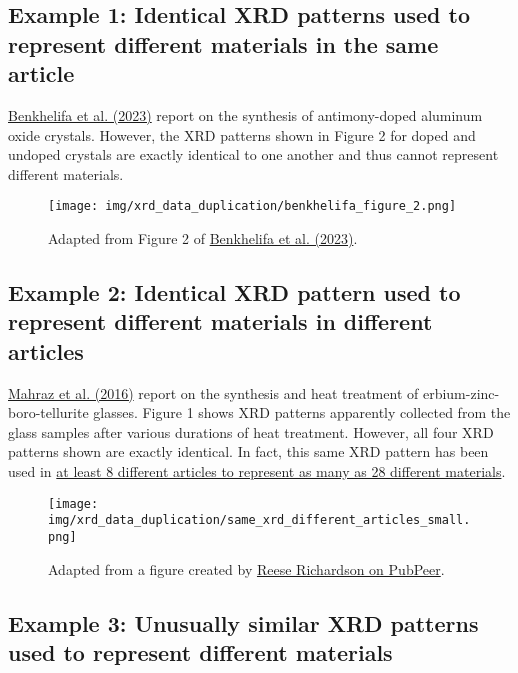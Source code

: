 \documentclass[letterpaper, 12pt]{article}
\begin{document}
\subsection*{Example 1: Identical XRD patterns used to represent different materials in the same article}

\href{https://doi.org/10.1007/s10971-023-06078-x}{Benkhelifa et al. (2023)} report on the synthesis of antimony-doped aluminum oxide crystals. However, the XRD patterns shown in Figure 2 for doped and undoped crystals are exactly identical to one another and thus cannot represent different materials.

\begin{figure}[h!tbp]
    \centering
    \texttt{[image: img/xrd\_data\_duplication/benkhelifa\_figure\_2.png]}
    \caption*{Adapted from Figure 2 of \href{https://doi.org/10.1007/s10971-023-06078-x}{Benkhelifa et al. (2023)}.}
\end{figure}

\pagebreak

\subsection*{Example 2: Identical XRD pattern used to represent different materials in different articles}

\href{https://doi.org/10.1016/j.jlumin.2016.07.051}{Mahraz et al. (2016)} report on the synthesis and heat treatment of erbium-zinc-boro-tellurite glasses. Figure 1 shows XRD patterns apparently collected from the glass samples after various durations of heat treatment. However, all four XRD patterns shown are exactly identical. In fact, this same XRD pattern has been used in \href{https://pubpeer.com/publications/27A40862805C08DD269520435EAC67\#1}{at least 8 different articles to represent as many as 28 different materials}.

\begin{figure}[h!tbp]
    \centering
    \texttt{[image: img/xrd\_data\_duplication/same\_xrd\_different\_articles\_small.png]}
    \caption*{Adapted from a figure created by \href{https://pubpeer.com/publications/8A1A8F322680DFB05011853190C254\#1}{Reese Richardson on PubPeer}.}
\end{figure}

\pagebreak

\subsection*{Example 3: Unusually similar XRD patterns used to represent different materials}
\end{document}
